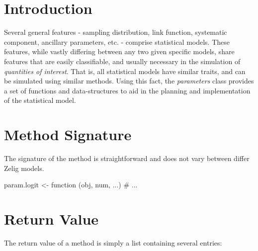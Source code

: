 \section{Introduction}
\label{section:param-intro}

Several general features - sampling distribution, link function,
systematic component, ancillary parameters, etc. - comprise
statistical models.  These features, while vastly differing between
any two given specific models, share features that are easily
classifiable, and usually necessary in the simulation of
\emph{quantities of interest}.  That is, all statistical models have
similar traits, and can be simulated using similar methods.  Using
this fact, the \emph{parameters} class provides a set of functions
and data-structures to aid in the planning and implementation of 
the statistical model.

\section{ Method Signature}

The signature of the  method is straightforward and does not vary between differ Zelig models.

\begin{Code}
param.logit <- function (obj, num, ...) {
  # ...
}
\end{Code}

\section{ Return Value}

The return value of a  method is simply a list containing several entries:

